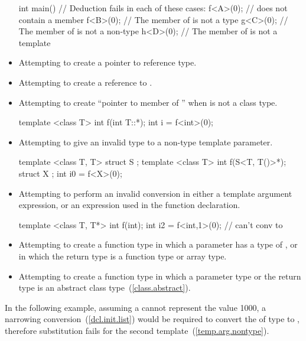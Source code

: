 \begin{itemize}
\begin{codeblock}
int main() {
  // Deduction fails in each of these cases:
  f<A>(0);  //  does not contain a member 
  f<B>(0);  // The  member of  is not a type
  g<C>(0);  // The  member of  is not a non-type
  h<D>(0);  // The  member of  is not a template
}
\end{codeblock}
\exitexample
\item
Attempting to create a pointer to reference type.
\item
Attempting to create a reference to .
\item
Attempting to create ``pointer to member of '' when  is not a
class type.
\enterexample

\begin{codeblock}
template <class T> int f(int T::*);
int i = f<int>(0);
\end{codeblock}
\exitexample
\item
Attempting to give an invalid type to a non-type template parameter.
\enterexample
\begin{codeblock}
template <class T, T> struct S {};
template <class T> int f(S<T, T()>*);
struct X {};
int i0 = f<X>(0);
\end{codeblock}
\exitexample

\item
Attempting to perform an invalid conversion in either a template
argument expression, or an expression used in the function
declaration.
\enterexample

\begin{codeblock}
template <class T, T*> int f(int);
int i2 = f<int,1>(0);           // can't conv  to 
\end{codeblock}
\exitexample

\item
Attempting to create a function type in which a parameter has a type
of , or in which the return type is a function type
or array type.

\item
Attempting to create a function type in which a parameter type or the return type is an
abstract class type~(\ref{class.abstract}).
\end{itemize}
\exitnote

\pnum
\enterexample
In the following example,
assuming a 
cannot represent the value 1000,
a narrowing conversion~(\ref{dcl.init.list})
would be required
to convert the 
of type  to ,
therefore substitution fails for the
second template~(\ref{temp.arg.nontype}).


